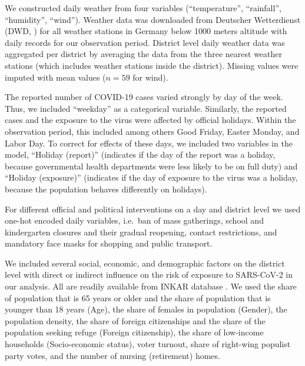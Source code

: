\documentclass[]{elsarticle} %
\begin{document}
We constructed daily weather from four variables (``temperature'', ``rainfall'', ``humidity'', ``wind''). Weather data was downloaded from Deutscher Wetterdienst (DWD, \citep{dwd_weather}) for all weather stations in Germany below 1000 meters altitude with daily records for our observation period. District level daily weather data was aggregated per district by averaging the data from the three nearest weather stations (which includes weather stations inside the district). Missing values were imputed with mean values (\(n=59\) for wind).

The reported number of COVID-19 cases varied strongly by day of the week. Thus, we included ``weekday'' as a categorical variable. Similarly, the reported cases and the exposure to the virus were affected by official holidays. Within the observation period, this included among others Good Friday, Easter Monday, and Labor Day. To correct for effects of these days, we included two variables in the model, ``Holiday (report)'' (indicates if the day of the report was a holiday, because governmental health departments were less likely to be on full duty) and ``Holiday (exposure)'' (indicates if the day of exposure to the virus was a holiday, because the population behaves differently on holidays).

For different official and political interventions on a day and district level we used one-hot encoded daily variables, i.e.~ban of mass gatherings, school and kindergarten closures and their gradual reopening, contact restrictions, and mandatory face masks for shopping and public transport.

We included several social, economic, and demographic factors on the district level with direct or indirect influence on the risk of exposure to SARS-CoV-2 in our analysis. All are readily available from INKAR database \citep{inkar}. We used the share of population that is 65 years or older and the share of population that is younger than 18 years (Age), the share of females in population (Gender), the population density, the share of foreign citizenships and the share of the population seeking refuge (Foreign citizenship), the share of low-income households (Socio-economic status), voter turnout, share of right-wing populist party votes, and the number of nursing (retirement) homes.
\end{document}
